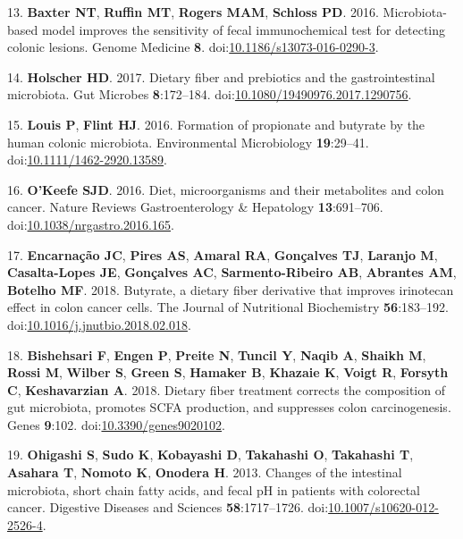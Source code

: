 \documentclass[11pt,]{article}
\begin{document}
\hypertarget{ref-Baxter2016}{}
13. \textbf{Baxter NT}, \textbf{Ruffin MT}, \textbf{Rogers MAM},
\textbf{Schloss PD}. 2016. Microbiota-based model improves the
sensitivity of fecal immunochemical test for detecting colonic lesions.
Genome Medicine \textbf{8}.
doi:\href{https://doi.org/10.1186/s13073-016-0290-3}{10.1186/s13073-016-0290-3}.

\hypertarget{ref-Holscher2017}{}
14. \textbf{Holscher HD}. 2017. Dietary fiber and prebiotics and the
gastrointestinal microbiota. Gut Microbes \textbf{8}:172--184.
doi:\href{https://doi.org/10.1080/19490976.2017.1290756}{10.1080/19490976.2017.1290756}.

\hypertarget{ref-Louis2016}{}
15. \textbf{Louis P}, \textbf{Flint HJ}. 2016. Formation of propionate
and butyrate by the human colonic microbiota. Environmental Microbiology
\textbf{19}:29--41.
doi:\href{https://doi.org/10.1111/1462-2920.13589}{10.1111/1462-2920.13589}.

\hypertarget{ref-test_OKeefe2016}{}
16. \textbf{O'Keefe SJD}. 2016. Diet, microorganisms and their
metabolites and colon cancer. Nature Reviews Gastroenterology \&
Hepatology \textbf{13}:691--706.
doi:\href{https://doi.org/10.1038/nrgastro.2016.165}{10.1038/nrgastro.2016.165}.

\hypertarget{ref-Encarnao2018}{}
17. \textbf{Encarnação JC}, \textbf{Pires AS}, \textbf{Amaral RA},
\textbf{Gonçalves TJ}, \textbf{Laranjo M}, \textbf{Casalta-Lopes JE},
\textbf{Gonçalves AC}, \textbf{Sarmento-Ribeiro AB}, \textbf{Abrantes
AM}, \textbf{Botelho MF}. 2018. Butyrate, a dietary fiber derivative
that improves irinotecan effect in colon cancer cells. The Journal of
Nutritional Biochemistry \textbf{56}:183--192.
doi:\href{https://doi.org/10.1016/j.jnutbio.2018.02.018}{10.1016/j.jnutbio.2018.02.018}.

\hypertarget{ref-Bishehsari2018}{}
18. \textbf{Bishehsari F}, \textbf{Engen P}, \textbf{Preite N},
\textbf{Tuncil Y}, \textbf{Naqib A}, \textbf{Shaikh M}, \textbf{Rossi
M}, \textbf{Wilber S}, \textbf{Green S}, \textbf{Hamaker B},
\textbf{Khazaie K}, \textbf{Voigt R}, \textbf{Forsyth C},
\textbf{Keshavarzian A}. 2018. Dietary fiber treatment corrects the
composition of gut microbiota, promotes SCFA production, and suppresses
colon carcinogenesis. Genes \textbf{9}:102.
doi:\href{https://doi.org/10.3390/genes9020102}{10.3390/genes9020102}.

\hypertarget{ref-Ohigashi2013}{}
19. \textbf{Ohigashi S}, \textbf{Sudo K}, \textbf{Kobayashi D},
\textbf{Takahashi O}, \textbf{Takahashi T}, \textbf{Asahara T},
\textbf{Nomoto K}, \textbf{Onodera H}. 2013. Changes of the intestinal
microbiota, short chain fatty acids, and fecal pH in patients with
colorectal cancer. Digestive Diseases and Sciences
\textbf{58}:1717--1726.
doi:\href{https://doi.org/10.1007/s10620-012-2526-4}{10.1007/s10620-012-2526-4}.
\end{document}
